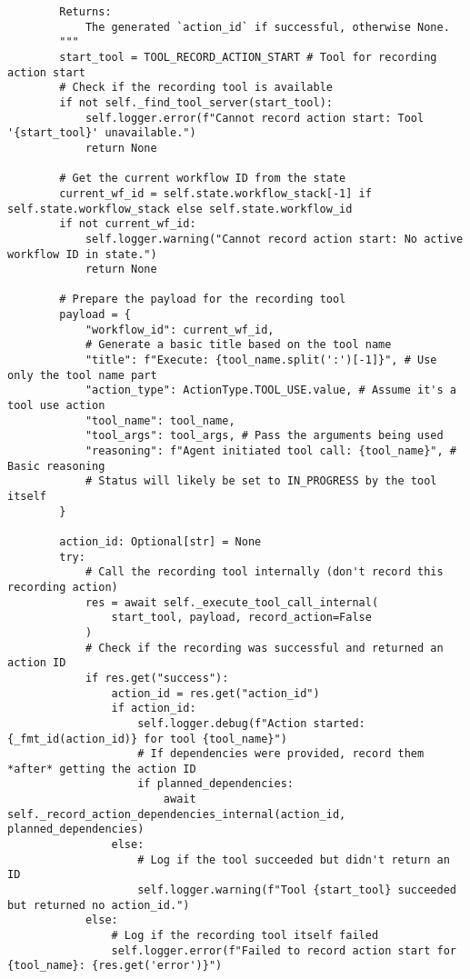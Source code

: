 \documentclass[12pt,a4paper]{article}
\begin{document}
\begin{pageablecode}
\begin{verbatim}
        Returns:
            The generated `action_id` if successful, otherwise None.
        """
        start_tool = TOOL_RECORD_ACTION_START # Tool for recording action start
        # Check if the recording tool is available
        if not self._find_tool_server(start_tool):
            self.logger.error(f"Cannot record action start: Tool '{start_tool}' unavailable.")
            return None

        # Get the current workflow ID from the state
        current_wf_id = self.state.workflow_stack[-1] if self.state.workflow_stack else self.state.workflow_id
        if not current_wf_id:
            self.logger.warning("Cannot record action start: No active workflow ID in state.")
            return None

        # Prepare the payload for the recording tool
        payload = {
            "workflow_id": current_wf_id,
            # Generate a basic title based on the tool name
            "title": f"Execute: {tool_name.split(':')[-1]}", # Use only the tool name part
            "action_type": ActionType.TOOL_USE.value, # Assume it's a tool use action
            "tool_name": tool_name,
            "tool_args": tool_args, # Pass the arguments being used
            "reasoning": f"Agent initiated tool call: {tool_name}", # Basic reasoning
            # Status will likely be set to IN_PROGRESS by the tool itself
        }

        action_id: Optional[str] = None
        try:
            # Call the recording tool internally (don't record this recording action)
            res = await self._execute_tool_call_internal(
                start_tool, payload, record_action=False
            )
            # Check if the recording was successful and returned an action ID
            if res.get("success"):
                action_id = res.get("action_id")
                if action_id:
                    self.logger.debug(f"Action started: {_fmt_id(action_id)} for tool {tool_name}")
                    # If dependencies were provided, record them *after* getting the action ID
                    if planned_dependencies:
                        await self._record_action_dependencies_internal(action_id, planned_dependencies)
                else:
                    # Log if the tool succeeded but didn't return an ID
                    self.logger.warning(f"Tool {start_tool} succeeded but returned no action_id.")
            else:
                # Log if the recording tool itself failed
                self.logger.error(f"Failed to record action start for {tool_name}: {res.get('error')}")


\end{verbatim}
\end{pageablecode}
\end{document}
